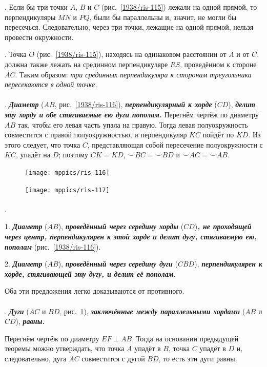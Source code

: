 \documentclass[twoside]{book}
\begin{document}
\smallskip
{}.
Если бы три точки $A$, $B$ и $C$ (рис.~\ref{1938/ris-115}) лежали на одной прямой, то перпендикуляры $MN$ и $PQ$, были бы параллельны и, значит, не могли бы пересечься.
Следовательно, через три точки, лежащие на одной прямой, нельзя провести окружности.

\smallskip
{}.
Точка $O$ (рис.~\ref{1938/ris-115}), находясь на одинаковом расстоянии от $A$ и от $C$, должна также лежать на срединном перпендикуляре $RS$, проведённом к стороне $AC$. 
Таким образом:
\emph{три срединных перпендикуляра к сторонам треугольника пересекаются в одной точке.}

\paragraph{}\label{1938/105}
\mbox{.}
\textbf{\emph{Диаметр}} ($AB$, рис.~\ref{1938/ris-116}), \textbf{\emph{перпендикулярный к хорде}} ($CD$), \textbf{\emph{делит эту хорду и обе стягиваемые ею дуги пополам.}}
Перегнём чертёж по диаметру $AB$ так, чтобы его левая часть упала на правую.
Тогда левая полуокружность совместится с правой полуокружностью, и перпендикуляр $KC$ пойдёт по $KD$.
Из этого следует, что точка $C$, представляющая собой пересечение полуокружности с $KC$, упадёт на $D$;
поэтому $CK=KD$,
${\smallsmile} BC={\smallsmile} BD$ и
${\smallsmile} AC={\smallsmile} AB$.

{

\begin{figure}
\centering
\texttt{[image: mppics/ris-116]}
\caption{}\label{1938/ris-116}
\bigskip
\texttt{[image: mppics/ris-117]}
\caption{}\label{1938/ris-117}
\end{figure}

\paragraph{}\label{1938/106}
\mbox{.}

1.
\textbf{\emph{Диаметр}} ($AB$), \textbf{\emph{проведённый через середину хорды}} ($CD$)\textbf{\emph{, не проходящей через центр, перпендикулярен к этой хорде и делит дугу, стягиваемую ею, пополам}} (рис.~\ref{1938/ris-116}).


2.
\textbf{\emph{Диаметр}} ($AB$), \textbf{\emph{проведённый через середину дуги}} ($CBD$), \textbf{\emph{перпендикулярен к хорде, стягивающей эту дугу, и делит её пополам.}}

Оба эти предложения легко доказываются от противного.


\paragraph{}\label{1938/107}
\mbox{.}
\textbf{\emph{Дуги}} ($AC$ и $BD$, рис.~\ref{1938/ris-117}), \textbf{\emph{заключённые между параллельными хордами}} ($AB$ и $CD$), \textbf{\emph{равны.}}

Перегнём чертёж по диаметру $EF\perp AB$.
Тогда на основании предыдущей теоремы можно утверждать, что точка $A$ упадёт в $B$, точка $C$ упадёт в $D$ и, следовательно, дуга $AC$ совместится с дугой $BD$, то есть эти дуги равны.

}
\end{document}
